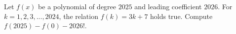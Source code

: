 Let $f(x)$ be a polynomial of degree $2025$ and leading coefficient $2026$. For $k = 1, 2, 3, ..., 2024$, the relation $f(k) = 3k + 7$ holds true. Compute $f(2025) -f(0) - 2026!$.
